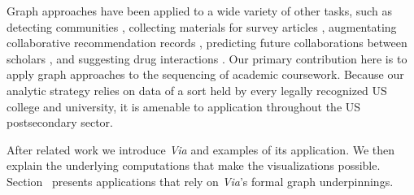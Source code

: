 Graph approaches have been applied to a wide variety of other tasks, such as detecting communities \cite{Fortunato2004}, collecting materials for survey articles \cite{ji2015}, augmentating collaborative recommendation records \cite{huang2005}, predicting future collaborations between scholars \cite{liben2007}, and suggesting drug interactions \cite{zitnik2018}. Our primary contribution here is to apply graph approaches to the sequencing of academic coursework. Because our analytic strategy relies on data of a sort held by every legally recognized US college and university, it is amenable to application throughout the US postsecondary sector. 





After related work we introduce {\em Via} and examples of its
application. We then explain the underlying computations that make the
visualizations possible. Section~ presents
applications that rely on {\em Via}'s formal graph underpinnings.



